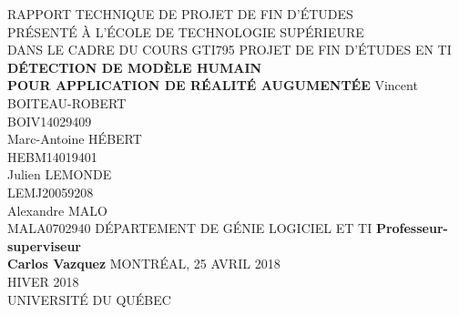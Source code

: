 \documentclass[letterpaper,twoside,12pt,french]{report}
\newcommand{\reportTitle}{\uppercase{Détection de modèle humain\\Pour application de réalité augumentée}}
\newcommand{\reportAuthors}{Vincent \uppercase{Boiteau-Robert\\BOIV14029409}\\Marc-Antoine \uppercase{Hébert\\HEBM14019401}\\Julien \uppercase{Lemonde\\LEMJ20059208}\\Alexandre \uppercase{Malo\\MALA0702940}}
\begin{document}
\setlength{\parindent}{0cm}\setlength{\parskip}{2ex minus 0.2ex}
\begin{titlepage}
    \begin{center}
        \uppercase{Rapport technique de projet de fin d'études\\Présenté à l'école de technologie supérieure\\Dans le cadre du cours GTI795 Projet de fin d'études en TI}
        \vfill
        \textbf{\reportTitle}
        \vfill
        \reportAuthors
        \vfill
        \uppercase{Département de génie logiciel et TI}
        \vfill
        \textbf{Professeur-superviseur\\Carlos Vazquez}
        \vfill
        \uppercase{Montréal, 25 avril 2018\\Hiver 2018\\Université du Québec}
    \end{center}
\end{titlepage}
\cleardoublepage
\begin{abstract}
    \begin{center}
        \textbf{\uppercase{\Large{Résumé}}}
        \vspace{2ex}
        \\ \textbf{\reportTitle}
        \\ \vspace{1\baselineskip}
        \reportAuthors
        \\ \vspace{1\baselineskip}
        \end{center}
        \par 
        \par
       Le projet consite à détecter un être humain à l'aide d'une caméra 3D afin d'être en mesure 
        d'aller récupérer la texture et la 		profondeur. Pour ensuite convertir l'humain détecté en 
        modèle 3D. Une fois le modèle bâti, le projet consite aussi à intégrer le modèle humain dans 
        une application de réalité augmenté. Celle-ci repose sur framework ARKit de Apple.
        Le tout, encapsuler dans une seule et même application unique. 
        \par
       Ce document contient une introduction sur le sujet ainsi qu'une revue de la documentation utilisé
        pour la réalisation de ce projet. De plus, la méthodologie de travail utilisé et le processus de conception
        y sont documentés. Le tout se termine avec une discussion et une conclusion.
    \vspace{-\baselineskip}
\end{abstract}
\tableofcontents
\listoftables
\listoffigures
\end{document}
